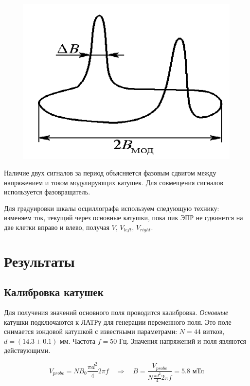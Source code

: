 \documentclass[a4paper, 12pt]{article} %
\begin{document}
	\begin{figure}[h!]
		\centering
		\begin{minipage}{0.5\textwidth}
			\centering
			\includegraphics[width=0.9\linewidth]{res/xy.png}
		\end{minipage}%
	\end{figure}
	
	Наличие двух сигналов за период объясняется фазовым сдвигом между напряжением и током модулирующих катушек. Для совмещения сигналов используется фазовращатель.
	
	Для градуировки шкалы осциллографа используем следующую технику: изменяем ток, текущий через основные катушки, пока пик ЭПР не сдвинется на две клетки вправо и влево, получая $V$, $V_{left}$, $V_{right}$.

	\section*{Результаты}
	
	\subsection*{Калибровка катушек}
	
	Для получения значений основного поля проводится калибровка. \textit{Основные} катушки подключаются к ЛАТРу для генерации переменного поля. Это поле снимается зондовой катушкой с известными параметрами: $N = 44$ витков, $d = (14.3 \pm 0.1)$ мм. Частота $f = 50$ Гц. Значения напряжений и поля являются действующими.
	
	$$V_{probe} = N B_0 \frac{\pi d^2}{4} 2 \pi f \quad \Rightarrow \quad B = \frac{V_{probe}}{N \frac{\pi d^2}{4} 2 \pi f} = 5.8 \text{ мТл} $$
	
\end{document}
